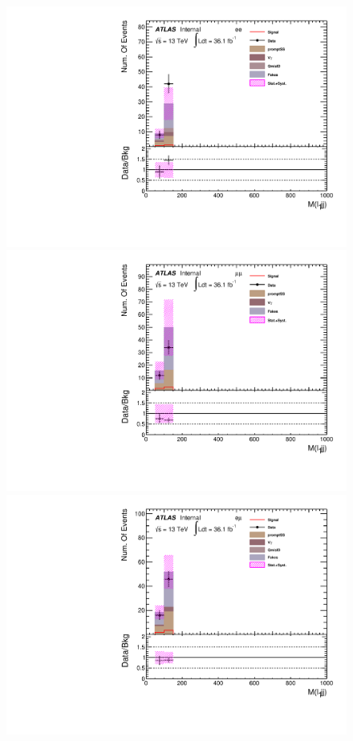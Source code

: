 \begin{figure}[h]
\begin{minipage}[t]{0.33\linewidth}
 \centering
 \includegraphics[width=1.0\textwidth,angle=-90]{fig/SigOpt/H300_S135_m_l1jj_ee.pdf}
 \end{minipage}
 \begin{minipage}[t]{0.33\linewidth}
 \centering
 \includegraphics[width=1.0\textwidth,angle=-90]{fig/SigOpt/H300_S135_m_l1jj_mumu.pdf}
 \end{minipage}
 \begin{minipage}[t]{0.33\linewidth}
 \centering
 \includegraphics[width=1.0\textwidth,angle=-90]{fig/SigOpt/H300_S135_m_l1jj_emu.pdf}

\end{minipage}
\end{figure}
